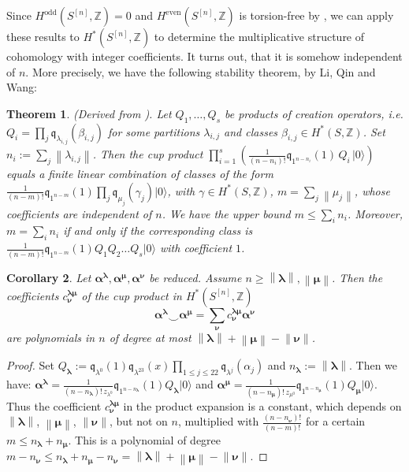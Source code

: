 \documentclass{amsart}
\newcommand{\hilb}[1]{^{[#1]}}
\newcommand{\ie}{{\it i.e. }}
\newcommand{\vac}{|0\rangle}
\newcommand{\IZ}{\mathbb{Z}}
\newcommand{\kq}{\mathfrak{q}}
\theoremstyle{plain}
\newtheorem{theorem}{Theorem}[section]
\newtheorem{corollary}[theorem]{Corollary}
\theoremstyle{definition}
\theoremstyle{remark}
\begin{document}
Since $H^\text{odd}(S\hilb{n},\IZ) = 0$ and $H^\text{even}(S\hilb{n},\IZ)$ is torsion-free by \cite{Markman}, we can apply these results to $H^\ast(S\hilb{n}, \IZ)$ to determine the multiplicative structure of cohomology with integer coefficients. It turns out, that it is somehow independent of $n$. More precisely, we have the following stability theorem, by Li, Qin and Wang:
\begin{theorem} \label{stability}\emph{(Derived from \cite[Thm.~2.1]{QinWang}).}
Let $Q_1,\ldots,Q_s$ be products of creation operators, \ie $Q_i = \prod_j \kq_{\lambda_{i,j}}(\beta_{i,j}) $ for some partitions $\lambda_{i,j}$ and classes $\beta_{i,j}\in H^\ast(S,\IZ)$. Set $n_i := \sum_j \left\|\lambda_{i,j}\right\|$.
Then the cup product 
$ \prod_{i=1}^s \left(\frac{1}{(n-n_i)!} \kq_{1^{n-n_i}}(1) \,Q_i \,\vac \right)$ equals a finite linear combination of classes of the form $\frac{1}{(n-m)!}\kq_{1^{n-m}}(1)\prod_j \kq_{\mu_{j}}(\gamma_{j})\vac$, with $\gamma\in H^\ast(S,\IZ)$, $m=\sum_j\left\|\mu_j\right\|$, whose coefficients are independent of $n$. We have the upper bound $m\leq\sum_i n_i$. Moreover, $m=\sum_i n_i$ if and only if the corresponding class is $\frac{1}{(n-m)!}\kq_{1^{n-m}}(1)Q_1Q_2\ldots Q_s\vac$ with coefficient $1$.
\end{theorem}
\begin{corollary} \label{stabCor} Let $\boldsymbol{\alpha}^{\boldsymbol{\lambda}},\boldsymbol{\alpha}^{\boldsymbol{\mu}},\boldsymbol{\alpha}^{\boldsymbol{\nu}}$ be reduced. Assume $n\geq\left\|\boldsymbol\lambda\right\|,\left\|\boldsymbol\mu\right\| $. Then the coefficients $c^{\boldsymbol{\lambda\mu}}_{\boldsymbol{\nu}}$ of the cup product in $H^\ast(S\hilb{n},\IZ)$
$$\boldsymbol{\alpha}^{\boldsymbol{\lambda}} \smile
\boldsymbol{\alpha}^{\boldsymbol{\mu}}
= \sum_{\boldsymbol{\nu}} c^{\boldsymbol{\lambda\mu}}_{\boldsymbol{\nu}} \boldsymbol{\alpha}^{\boldsymbol{\nu}}
$$  
are polynomials in $n$ of degree at most $ \left\|\boldsymbol\lambda\right\|+\left\|\boldsymbol\mu\right\|-\left\|\boldsymbol\nu\right\|$.
\end{corollary}
\begin{proof} Set $Q_{\boldsymbol{\lambda}}:=  \kq_{\lambda^0}(1)\kq_{\lambda^{23}}(x)\prod_{1\leq j\leq 22}\kq_{\lambda^j}(\alpha_j)$ and $n_{\boldsymbol\lambda}:=\left\|\boldsymbol\lambda\right\|$. Then we have:
$\boldsymbol{\alpha}^{\boldsymbol{\lambda}} = \frac{1}{(n-n_{\boldsymbol\lambda})!\,z_{\lambda^0}}\kq_{1^{n-n_{\boldsymbol\lambda}}}(1)Q_{\boldsymbol\lambda}\vac$ and $
\boldsymbol{\alpha}^{\boldsymbol{\mu}}=\frac{1}{(n-n_{\boldsymbol\mu})!\,z_{\mu^0}}\kq_{1^{n-n_{\boldsymbol\mu}}}(1)Q_{\boldsymbol\mu}\vac $. 
Thus the coefficient $c^{\boldsymbol{\lambda\mu}}_{\boldsymbol{\nu}}$ in the product expansion is a constant, which depends on $ \left\|\boldsymbol\lambda\right\|$, $\left\|\boldsymbol\mu\right\|$, $\left\|\boldsymbol\nu\right\|$, but not on $n$, multiplied with $\frac{(n-n_{\boldsymbol\nu})!}{(n-m)!}$ for a certain $m\leq n_{\boldsymbol\lambda}+n_{\boldsymbol\mu}$. 
This is a polynomial of degree $m-n_{\boldsymbol\nu}\leq n_{\boldsymbol\lambda}+n_{\boldsymbol\mu}-n_{\boldsymbol\nu} =\left\|\boldsymbol\lambda\right\|+\left\|\boldsymbol\mu\right\|-\left\|\boldsymbol\nu\right\| $.
\end{proof}
\end{document}
